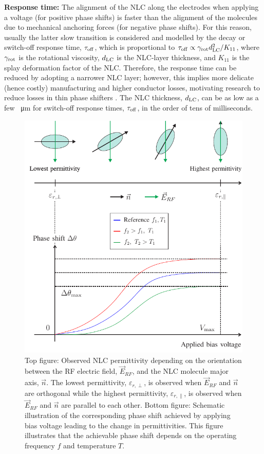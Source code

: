 \textbf{Response time:} The alignment of the \gls{NLC} along the electrodes when applying a voltage (for positive phase shifts) is faster than the alignment of the molecules due to mechanical anchoring forces (for negative phase shifts). For this reason, usually the latter slow transition is considered and modelled by the decay or switch-off response time, $\tau_{\rm off}$, which is proportional to $\tau_{\rm off} \propto {\gamma_{\rm rot}{d_{\rm LC}^2}}/{K_{11}}$,  where  $\gamma_{\rm rot}$ is the rotational viscosity, $d_{\rm LC}$ is the \gls{NLC}-layer thickness, and $K_{11}$ is the splay deformation factor of the \gls{NLC}. Therefore, the response time can be reduced by adopting a narrower \gls{NLC} layer; however, this implies more delicate (hence costly) manufacturing and higher conductor losses, motivating research to reduce losses in thin phase shifters \cite{neuder2023compact}.  The \gls{NLC} thickness, $d_{\rm LC}$, can be as low as a few \SI{}{\micro\meter} for switch-off response times, $\tau_\mathrm{\rm off}$, in the order of tens of milliseconds. 

\begin{figure}[t]
	\centering
 \includegraphics[width=0.8\columnwidth]{Figures/LCmolres.pdf}
	\caption{Top figure: Observed \gls{NLC} permittivity depending on the orientation between the \gls{RF} electric field, $\vec{E}_{RF}$, and the \gls{NLC} molecule major axis, $\vec{n}$. The lowest permittivity, $\varepsilon_{r,\perp}$, is observed when $\vec{E}_{RF}$ and $\vec{n}$ are orthogonal while the highest permittivity, $\varepsilon_{r,\parallel}$, is observed when $\vec{E}_{RF}$ and $\vec{n}$ are parallel to each other. Bottom figure: Schematic illustration of the corresponding phase shift achieved by applying bias voltage leading to the change in permittivities. This figure illustrates that the achievable phase shift depends on the operating frequency $f$ and temperature $T$.}
 		\label{fig:LCmolres}
\end{figure}

